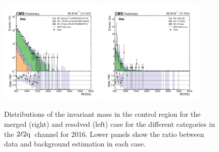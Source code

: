 \begin{figure}[htbp]
    \includegraphics[width=0.45\textwidth]{figures/HighMassSearches/dataMCPlots/mass2l2jet_CR_2lep_vbftag.png}
    \includegraphics[width=0.45\textwidth]{figures/HighMassSearches/dataMCPlots/mass2lj_CR_2lep_vbftag.png}\\

    \caption{Distributions of the invariant mass \mZZ{} in the control region for the merged (right) and resolved (left) case for the different categories in the $2{\ell}2\mathrm{q}\hspace{0.2em}$ channel for 2016.
    Lower panels show the ratio between data and background estimation in each case.
    }
    \label{fig:ZZmass_untag}
 \end{figure}


